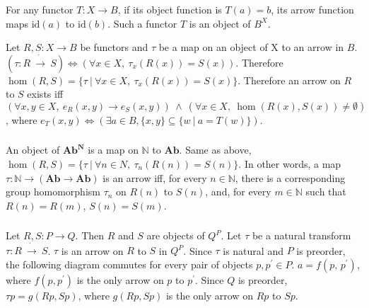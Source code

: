 \documentclass{article}
\begin{document}
\subsubsection{}



\showArt

For any functor $T : X \rightarrow B$, if its object function is $T(a) = b$, its arrow function maps $\mathrm{id}(a)$ to $\mathrm{id}(b)$. Such a functor $T$ is an object of $B^X$.

Let $R, S : X \rightarrow B$ be functors and $\tau$ be a map on an object of X to an arrow in $B$. $(\tau : R\ \dot{\rightarrow}\ S) \Leftrightarrow (\forall x \in X,\ \tau_x(R(x)) = S(x))$. Therefore $\hom(R, S) = \{\tau\ |\ \forall x \in X,\ \tau_x(R(x)) = S(x)\}$. Therefore an arrow on $R$ to $S$ exists iff $(\forall x, y \in X,\ e_R(x, y) \rightarrow e_S(x, y))\ \wedge\ (\forall x \in X,\ \hom(R(x), S(x)) \neq \emptyset)$, where $e_T(x, y) \Leftrightarrow (\exists a \in B, \{x, y\} \subseteq \{ w\ |\ a = T(w) \})$.

\subsubsection{}



\showArt

An object of $\mathbf{Ab}^{\mathbf{N}}$ is a map on $\mathbb{N}$ to $\mathbf{Ab}$. Same as above, $\hom(R, S) = \{\tau\ |\ \forall n \in N,\ \tau_n(R(n)) = S(n)\}$. In other words, a map $\tau : \mathbb{N} \rightarrow (\mathbf{Ab} \rightarrow \mathbf{Ab})$ is an arrow iff, for every $n \in \mathbb{N}$, there is a corresponding group homomorphism $\tau_n$ on $R(n)$ to $S(n)$, and, for every $m \in \mathbb{N}$ such that $R(n) = R(m)$, $S(n) = S(m)$. 

\subsubsection{}



\showArt

Let $R, S : P \rightarrow Q$. Then $R$ and $S$ are objects of $Q^P$. Let $\tau$ be a natural transform $\tau : R\ \dot{\rightarrow}\ S$. $\tau$ is an arrow on $R$ to $S$ in $Q^P$. Since $\tau$ is natural and $P$ is preorder, the following diagram commutes for every pair of objects $p, p^\prime \in P$. $a = f(p,\,p^\prime)$, where $f(p, p^\prime)$ is the only arrow on $p$ to $p^\prime$. Since $Q$ is preorder, $\tau p = g(Rp, Sp)$, where $g(Rp, Sp)$ is the only arrow on $Rp$ to $Sp$.
\end{document}
